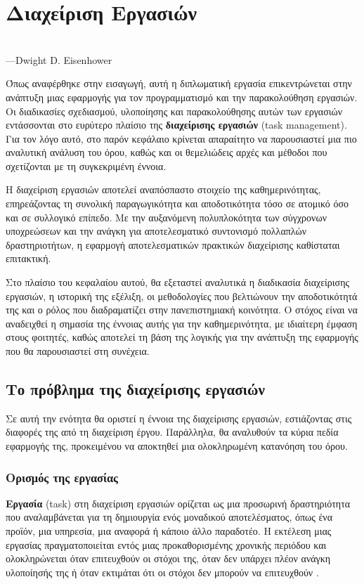 \chapter{Διαχείριση Εργασιών}
    \begin{displayquote} \centering
         \\
        \hspace*{\fill}---Dwight D. Eisenhower
    \end{displayquote}
    \vspace{1em}

    Όπως αναφέρθηκε στην εισαγωγή, αυτή η διπλωματική εργασία επικεντρώνεται στην ανάπτυξη μιας εφαρμογής για τον προγραμματισμό και την παρακολούθηση εργασιών. Οι διαδικασίες σχεδιασμού, υλοποίησης και παρακολούθησης αυτών των εργασιών εντάσσονται στο ευρύτερο πλαίσιο της \textbf{διαχείρισης εργασιών} (task management). Για τον λόγο αυτό, στο παρόν κεφάλαιο κρίνεται απαραίτητο να παρουσιαστεί μια πιο αναλυτική ανάλυση του όρου, καθώς και οι θεμελιώδεις αρχές και μέθοδοι που σχετίζονται με τη συγκεκριμένη έννοια.

    Η διαχείριση εργασιών αποτελεί αναπόσπαστο στοιχείο της καθημερινότητας, επηρεάζοντας τη συνολική παραγωγικότητα και αποδοτικότητα τόσο σε ατομικό όσο και σε συλλογικό επίπεδο. Με την αυξανόμενη πολυπλοκότητα των σύγχρονων υποχρεώσεων και την ανάγκη για αποτελεσματικό συντονισμό πολλαπλών δραστηριοτήτων, η εφαρμογή αποτελεσματικών πρακτικών διαχείρισης καθίσταται επιτακτική.

    Στο πλαίσιο του κεφαλαίου αυτού, θα εξεταστεί αναλυτικά η διαδικασία διαχείρισης εργασιών, η ιστορική της εξέλιξη, οι μεθοδολογίες που βελτιώνουν την αποδοτικότητά της και ο ρόλος που διαδραματίζει στην πανεπιστημιακή κοινότητα. Ο στόχος είναι να αναδειχθεί η σημασία της έννοιας αυτής για την καθημερινότητα, με ιδιαίτερη έμφαση στους φοιτητές, καθώς αποτελεί τη βάση της λογικής για την ανάπτυξη της εφαρμογής που θα παρουσιαστεί στη συνέχεια.

    \section{Το πρόβλημα της διαχείρισης εργασιών}
        Σε αυτή την ενότητα θα οριστεί η έννοια της διαχείρισης εργασιών, εστιάζοντας στις διαφορές της από τη διαχείριση έργου. Παράλληλα, θα αναλυθούν τα κύρια πεδία εφαρμογής της, προκειμένου να αποκτηθεί μια ολοκληρωμένη κατανόηση του όρου.

        \subsection{Ορισμός της εργασίας}
            \textbf{Εργασία} (task) στη διαχείριση εργασιών ορίζεται ως μια προσωρινή δραστηριότητα που αναλαμβάνεται για τη δημιουργία ενός μοναδικού αποτελέσματος, όπως ένα προϊόν, μια υπηρεσία, μια αναφορά ή κάποιο άλλο παραδοτέο. Η εκτέλεση μιας εργασίας πραγματοποιείται εντός μιας προκαθορισμένης χρονικής περιόδου και ολοκληρώνεται όταν επιτευχθούν οι στόχοι της, όταν δεν υπάρχει πλέον ανάγκη υλοποίησής της ή όταν εκτιμάται ότι οι στόχοι δεν μπορούν να επιτευχθούν \cite{PMBOK}.

